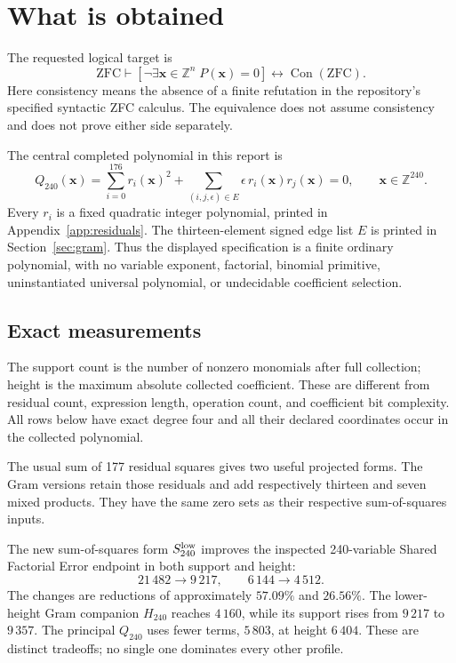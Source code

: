\documentclass[11pt]{article}
\theoremstyle{remark}\newtheorem{remark}[theorem]{Remark}
\newcommand{\Z}{\mathbb Z}
\newcommand{\Con}{\operatorname{Con}}
\newcommand{\ZFC}{\mathrm{ZFC}}
\begin{document}
\tableofcontents
\newpage

\section{What is obtained}

The requested logical target is
\begin{equation}\label{eq:target}
\ZFC\vdash
\left[\neg\exists\boldsymbol x\in\Z^n\;P(\boldsymbol x)=0\right]
\longleftrightarrow \Con(\ZFC).
\end{equation}
Here consistency means the absence of a finite refutation in the
repository's specified syntactic ZFC calculus. The equivalence does not
assume consistency and does not prove either side separately.

The central completed polynomial in this report is
\begin{equation}\label{eq:principal}
\boxed{\quad Q_{240}(\boldsymbol x)=
\sum_{i=0}^{176}r_i(\boldsymbol x)^2+
\sum_{(i,j,\epsilon)\in E}\epsilon\,r_i(\boldsymbol x)r_j(\boldsymbol x)=0,
\qquad \boldsymbol x\in\Z^{240}.\quad}
\end{equation}
Every $r_i$ is a fixed quadratic integer polynomial, printed in
Appendix~\ref{app:residuals}. The thirteen-element signed edge list $E$ is
printed in Section~\ref{sec:gram}. Thus the displayed specification is a
finite ordinary polynomial, with no variable exponent, factorial, binomial
primitive, uninstantiated universal polynomial, or undecidable coefficient
selection.

\subsection{Exact measurements}

The support count is the number of nonzero monomials after full collection;
height is the maximum absolute collected coefficient. These are different
from residual count, expression length, operation count, and coefficient
bit complexity. All rows below have exact degree four and all their
declared coordinates occur in the collected polynomial.


The usual sum of 177 residual squares gives two useful projected forms.
The Gram versions retain those residuals and add respectively thirteen and
seven mixed products. They have the same zero sets as their respective
sum-of-squares inputs.

The new sum-of-squares form $S_{240}^{\rm low}$ improves the inspected
240-variable Shared Factorial Error endpoint in both support and height:
\[
21\,482\longrightarrow9\,217,\qquad
6\,144\longrightarrow4\,512.
\]
The changes are reductions of approximately $57.09\%$ and $26.56\%$.
The lower-height Gram companion $H_{240}$ reaches $4\,160$, while its
support rises from $9\,217$ to $9\,357$. The principal $Q_{240}$ uses fewer
terms, $5\,803$, at height $6\,404$. These are distinct tradeoffs; no single
one dominates every other profile.
\end{document}
